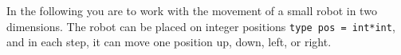 In the following you are to work with the movement of a small robot in two dimensions. The robot can be placed on integer positions \lstinline{type pos = int*int}, and in each step, it can move one position up, down, left, or right.
